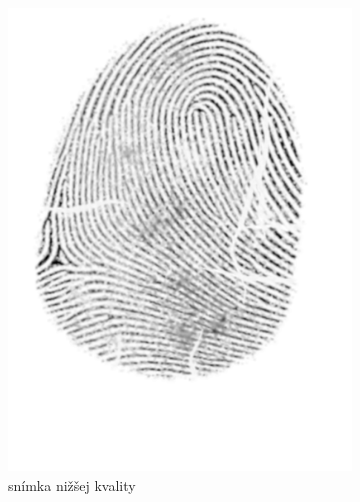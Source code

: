 \begin{figure}[h]
\begin{subfigure}[b]{0.3\linewidth}
      \includegraphics[width=\linewidth]{obrazky-figures/ecsema_orig.png}
      \caption{snímka nižšej kvality}
    \end{subfigure}
    \hfill
    \begin{subfigure}[b]{0.3\linewidth}

\end{subfigure}
\end{figure}
